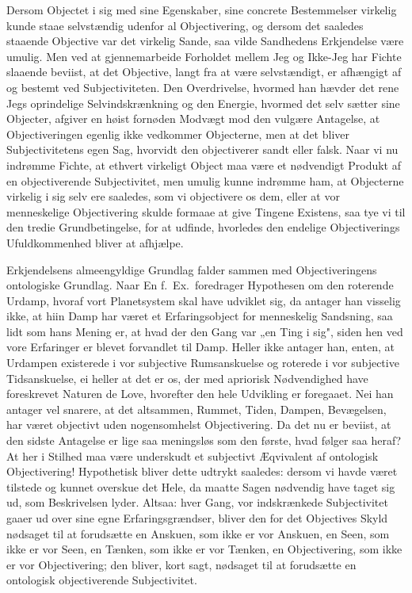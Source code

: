 \documentclass[12pt]{article}
\newcommand{\opage}[1]{\marginnote{\footnotesize\textit{[#1]}}}
\begin{document}
Dersom Objectet i sig med sine Egenskaber, sine concrete
Bestemmelser virkelig kunde staae selvstændig udenfor al
Objectivering, og dersom det saaledes staaende Objective var det
virkelig Sande, saa vilde Sandhedens Erkjendelse være umulig.
Men ved at gjennemarbeide Forholdet mellem Jeg og Ikke-Jeg
har Fichte slaaende beviist, at det Objective, langt fra at være
selvstændigt, er afhængigt af og bestemt ved Subjectiviteten.
Den Overdrivelse, hvormed han hævder det rene Jegs
oprindelige Selvindskrænkning og den Energie, hvormed det
selv sætter sine Objecter, afgiver en høist fornøden Modvægt
mod den vulgære Antagelse, at Objectiveringen egenlig ikke
vedkommer Objecterne, men at det bliver Subjectivitetens egen
Sag, hvorvidt den objectiverer sandt eller falsk. Naar vi nu
indrømme Fichte, at ethvert virkeligt Object maa være et
nødvendigt Produkt af en objectiverende Subjectivitet, men umulig
kunne indrømme ham, at Objecterne virkelig i sig selv ere
saaledes, som vi objectivere os dem, eller at vor menneskelige
Objectivering skulde formaae at give Tingene Existens, saa tye vi
til den tredie Grundbetingelse, for at udfinde, hvorledes den
endelige Objectiverings Ufuldkommenhed bliver at afhjælpe.

Erkjendelsens almeengyldige Grundlag falder sammen med
Objectiveringens ontologiske Grundlag. Naar En f.\ Ex.\ foredrager
Hypothesen om den roterende Urdamp, hvoraf vort Planetsystem
skal have udviklet sig, da antager han visselig ikke, at hiin
Damp har været et Erfaringsobject for menneskelig Sandsning,
saa lidt som hans Mening er, at hvad der den Gang var „en
Ting i sig", siden hen ved vore Erfaringer er blevet forvandlet
til Damp. Heller ikke antager han, enten, at Urdampen
\opage{26} existerede i vor subjective Rumsanskuelse og roterede i vor
subjective Tidsanskuelse, ei heller at det er os, der med
apriorisk Nødvendighed have foreskrevet Naturen de Love, hvorefter
den hele Udvikling er foregaaet. Nei han antager vel snarere,
at det altsammen, Rummet, Tiden, Dampen, Bevægelsen, har
været objectivt uden nogensomhelst Objectivering. Da det nu
er beviist, at den sidste Antagelse er lige saa meningsløs som
den første, hvad følger saa heraf? At her i Stilhed maa være
underskudt et subjectivt Æqvivalent af ontologisk Objectivering!
Hypothetisk bliver dette udtrykt saaledes: dersom vi havde
været tilstede og kunnet overskue det Hele, da maatte Sagen
nødvendig have taget sig ud, som Beskrivelsen lyder. Altsaa: hver
Gang, vor indskrænkede Subjectivitet gaaer ud over sine egne
Erfaringsgrændser, bliver den for det Objectives Skyld nødsaget
til at forudsætte en Anskuen, som ikke er vor Anskuen, en
Seen, som ikke er vor Seen, en Tænken, som ikke er vor Tænken,
en Objectivering, som ikke er vor Objectivering; den bliver,
kort sagt, nødsaget til at forudsætte en ontologisk objectiverende
Subjectivitet.
\end{document}
